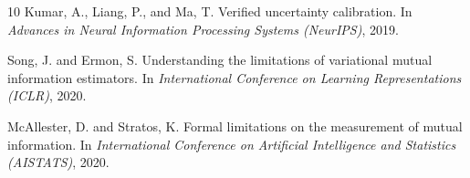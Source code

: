 \documentclass[11pt,a4paper]{article}
\theoremstyle{definition}
\begin{document}
\begin{thebibliography}{10}
Kumar, A., Liang, P., and Ma, T.
\newblock Verified uncertainty calibration.
\newblock In \emph{Advances in Neural Information Processing Systems (NeurIPS)}, 2019.

Song, J. and Ermon, S.
\newblock Understanding the limitations of variational mutual information estimators.
\newblock In \emph{International Conference on Learning Representations (ICLR)}, 2020.

McAllester, D. and Stratos, K.
\newblock Formal limitations on the measurement of mutual information.
\newblock In \emph{International Conference on Artificial Intelligence and Statistics (AISTATS)}, 2020.

\end{thebibliography}
\end{document}
